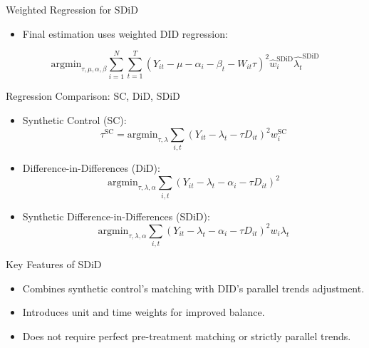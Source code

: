 \documentclass{beamer}
\begin{document}
\begin{frame}{Weighted Regression for SDiD}

\begin{itemize}
    \item Final estimation uses weighted DID regression:
\end{itemize}

\[
\textrm{argmin}_{\tau, \mu, \alpha, \beta} \sum_{i=1}^N \sum_{t=1}^T \left( Y_{it} - \mu - \alpha_i - \beta_t - W_{it}\tau \right)^2 \widehat{w}_i^{\text{SDiD}} \widehat{\lambda_t}^{\text{SDiD}}
\]

\end{frame}




\begin{frame}{Regression Comparison: SC, DiD, SDiD}

\begin{itemize}
    \item Synthetic Control (SC):
    \[
    \tau^{\text{SC}} = \textrm{argmin}_{\tau, \lambda} \sum_{i,t} (Y_{it} - \lambda_t - \tau D_{it})^2 w_i^{\text{SC}}
    \]
    \item Difference-in-Differences (DiD):
    \[
    \textrm{argmin}_{\tau, \lambda, \alpha} \sum_{i,t} (Y_{it} - \lambda_t - \alpha_i - \tau D_{it})^2
    \]
    \item Synthetic Difference-in-Differences (SDiD):
    \[
    \textrm{argmin}_{\tau, \lambda, \alpha} \sum_{i,t} (Y_{it} - \lambda_t - \alpha_i - \tau D_{it})^2 w_i \lambda_t
    \]
\end{itemize}

\end{frame}

\begin{frame}{Key Features of SDiD}

\begin{itemize}
    \item Combines synthetic control's matching with DID's parallel trends adjustment.
    \item Introduces unit and time weights for improved balance.
    \item Does not require perfect pre-treatment matching or strictly parallel trends.
\end{itemize}

\end{frame}
\end{document}
